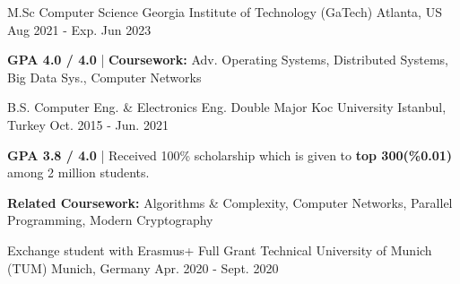 \begin{cventries}

\cvopenentry
    {M.Sc Computer Science } %
    {Georgia Institute of Technology (GaTech)} %
    {Atlanta, US} %
    {Aug 2021 - Exp. Jun 2023} %
    {\begin{cvghostitems} %
        \item {\textbf{GPA 4.0 / 4.0} | \textbf{Coursework:} Adv. Operating Systems, Distributed Systems, Big Data Sys., Computer Networks }
      \end{cvghostitems}
    }
\cvopenentry
    {B.S. Computer Eng. \& Electronics Eng. Double Major} %
    {Koc University } %
    {Istanbul, Turkey} %
    {Oct. 2015 - Jun. 2021} %
    {
      \begin{cvitems} %
        \item {\textbf{GPA 3.8 / 4.0} | Received 100\% scholarship which is given to \textbf{top 300(\%0.01)} among 2 million students.}
        \item {\textbf{Related Coursework:} Algorithms \& Complexity, Computer Networks, Parallel Programming, Modern Cryptography}
      \end{cvitems}
    }
\cvopenentry
    {Exchange student with Erasmus+ Full Grant }
    {Technical University of Munich (TUM)} %
    {Munich, Germany} %
    {Apr. 2020 - Sept. 2020} %
    {\begin{cvitems} %

\end{cvitems}}
\end{cventries}
